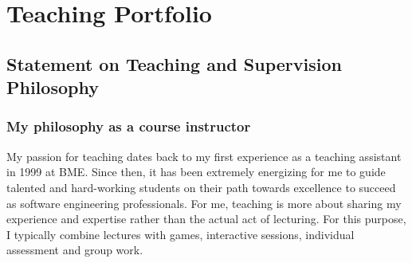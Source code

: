 \chapter{Teaching Portfolio}
\label{sec:teaching-portfolio}

%


\section{Statement on Teaching and Supervision Philosophy}

\subsection{My philosophy as a course instructor}

My passion for teaching dates back to my first experience as a teaching assistant in 1999 at BME. Since then, it has been 
extremely energizing for me to guide talented and hard-working students on their path towards excellence to succeed as 
software engineering professionals. For me, teaching is more about sharing my experience and expertise rather than the 
actual act of lecturing. For this purpose, I typically combine lectures with games, interactive sessions, individual 
assessment and group work. 

